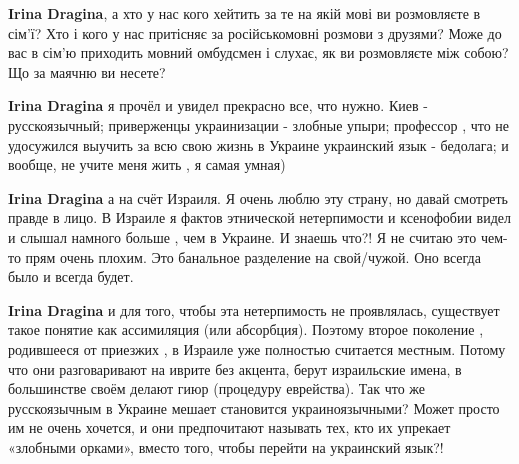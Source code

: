 \begin{itemize}
\begin{itemize}
 
\textbf{Irina Dragina}, а хто у нас кого хейтить за те на якій мові ви розмовляєте в сім'ї? Хто і кого у нас притісняє за російськомовні розмови з друзями? Може до вас в сім'ю приходить мовний омбудсмен і слухає, як ви розмовляєте між собою? Що за маячню ви несете?

 
\textbf{Irina Dragina} я прочёл и увидел прекрасно все, что нужно. Киев - русскоязычный; приверженцы украинизации - злобные упыри; профессор , что не удосужился выучить за всю свою жизнь в Украине украинский язык - бедолага; и вообще, не учите меня жить , я самая умная)

 
\textbf{Irina Dragina} а на счёт Израиля. Я очень люблю эту страну, но давай смотреть правде в лицо. В Израиле я фактов этнической нетерпимости и ксенофобии видел и слышал намного больше , чем в Украине. И знаешь что?! Я не считаю это чем-то прям очень плохим. Это банальное разделение на свой/чужой. Оно всегда было и всегда будет.

 
\textbf{Irina Dragina} и для того, чтобы эта нетерпимость не проявлялась, существует такое понятие как ассимиляция (или абсорбция). Поэтому второе поколение , родившееся от приезжих , в Израиле уже полностью считается местным. Потому что они разговаривают на иврите без акцента, берут израильские имена, в большинстве своём делают гиюр (процедуру еврейства). Так что же русскоязычным в Украине мешает становится украиноязычными? Может просто им не очень хочется, и они предпочитают называть тех, кто их упрекает «злобными орками», вместо того, чтобы перейти на украинский язык?!


\end{itemize}
\end{itemize}
